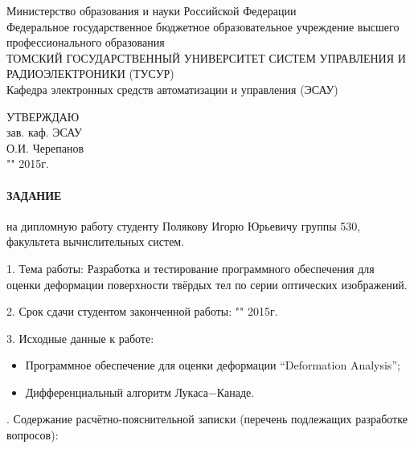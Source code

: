 \newpage
{}

\begin{center}
 Министерство образования и науки Российской Федерации\\
 Федеральное государственное бюджетное образовательное учреждение высшего профессионального образования\\
 ТОМСКИЙ ГОСУДАРСТВЕННЫЙ УНИВЕРСИТЕТ СИСТЕМ УПРАВЛЕНИЯ И РАДИОЭЛЕКТРОНИКИ (ТУСУР)\\
 Кафедра электронных средств автоматизации и управления (ЭСАУ)\\
\end{center}

\begin{flushright}
 \begin{minipage}{0.4\textwidth}
  УТВЕРЖДАЮ \\
  зав. каф. ЭСАУ \\
  \underline{\hspace{2.5cm}}О.И. Черепанов \\
  "\underline{\hspace{1cm}}"\underline{\hspace{3cm}} 2015г.
 \end{minipage}
\end{flushright}


\paragraph*{\hfill ЗАДАНИЕ \hfill}

на дипломную работу студенту Полякову Игорю Юрьевичу группы 530, факультета вычислительных систем.

1. Тема работы: Разработка и тестирование программного обеспечения для оценки деформации поверхности твёрдых тел по серии оптических изображений.

2. Срок сдачи студентом законченной работы: "\underline{\hspace{1cm}}"\underline{\hspace{3cm}} 2015г.

3. Исходные данные к работе:

\begin{itemize}
 \item Программное обеспечение для оценки деформации ``Deformation Analysis'';
 \item Дифференциальный алгоритм Лукаса−Канаде.
\end{itemize}
. Содержание расчётно-пояснительной записки (перечень подлежащих разработке вопросов):

